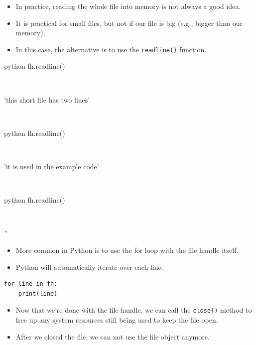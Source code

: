 \documentclass[aspectratio=1610,slidestop]{beamer}
\begin{document}
\begin{pframe}
 \begin{itemize}
  \item In practice, reading the whole file into memory is not always a good
  idea.
  \item It is practical for small files, but not if our file is big (e.g.,
  bigger than our memory).
  \item In this case, the alternative is to use the
  \texttt{readline()} function.
 \end{itemize}
 \begin{ipython}
  \begin{pythonin}{python}
fh.readline()
  \end{pythonin}
  \\
  \begin{pythonout}
'this short file has two lines'
  \end{pythonout}
  \\

  \begin{pythonin}{python}
fh.readline()
  \end{pythonin}
  \\
  \begin{pythonout}
'it is used in the example code'
  \end{pythonout}
  \\

  \begin{pythonin}{python}
fh.readline()
  \end{pythonin}
  \\
  \begin{pythonout}
''
  \end{pythonout}
 \end{ipython}

\end{pframe}

\begin{pframe}
 \begin{itemize}
  \item More common in Python is to use the for loop with the file handle
  itself.
  \item Python will automatically iterate over each line.
 \end{itemize}
 \begin{pythoncode}
  \begin{verbatim}
for line in fh:
    print(line)
  \end{verbatim}
 \end{pythoncode}
 \begin{itemize}
  \item Now that we're done with the file handle, we can call the
  \texttt{close()}
  method to free up any system resources still being used to keep the file open.
  \item After we closed the file, we can not use the file object anymore.
 \end{itemize}
\end{pframe}
\end{document}
